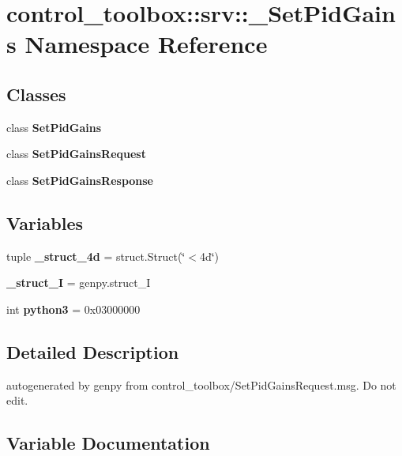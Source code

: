 \section{control\-\_\-toolbox\-:\-:srv\-:\-:\-\_\-\-Set\-Pid\-Gains \-Namespace \-Reference}
\label{namespacecontrol__toolbox_1_1srv_1_1__SetPidGains}
\subsection*{\-Classes}
\begin{DoxyCompactItemize}
\item 
class {\bf \-Set\-Pid\-Gains}
\item 
class {\bf \-Set\-Pid\-Gains\-Request}
\item 
class {\bf \-Set\-Pid\-Gains\-Response}
\end{DoxyCompactItemize}
\subsection*{\-Variables}
\begin{DoxyCompactItemize}
\item 
tuple {\bf \-\_\-struct\-\_\-4d} = struct.\-Struct(\char`\"{}$<$4d\char`\"{})
\item 
{\bf \-\_\-struct\-\_\-\-I} = genpy.\-struct\-\_\-\-I
\item 
int {\bf python3} = 0x03000000
\end{DoxyCompactItemize}


\subsection{\-Detailed \-Description}
\begin{DoxyVerb}autogenerated by genpy from control_toolbox/SetPidGainsRequest.msg. Do not edit.\end{DoxyVerb}
 

\subsection{\-Variable \-Documentation}
